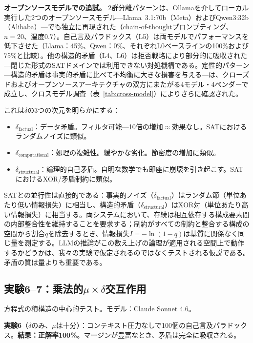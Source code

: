 \documentclass[11pt,a4paper]{article}
\begin{document}
\textbf{オープンソースモデルでの追試。}
2群分離パターンは、Ollamaを介してローカル実行した2つのオープンソースモデル---Llama~3.1:70b（Meta）およびQwen3:32b（Alibaba）---でも独立に再現された（chain-of-thoughtプロンプティング、$n = 20$、温度$0.7$）。自己言及パラドックス（L5）は両モデルでパフォーマンスを低下させた（Llama：45\%、Qwen：0\%、それぞれL0ベースラインの100\%および75\%と比較）。他の構造的矛盾（L4、L6）は拒否戦略により部分的に吸収された---閉じた形式のSATドメインでは利用できない対処機構である。定性的パターン---構造的矛盾は事実的矛盾に比べて不均衡に大きな損害を与える---は、クローズドおよびオープンソースアーキテクチャの双方にまたがる4モデル・4ベンダーで成立し、クロスモデル調査（表~\ref{tab:cross-model}）によりさらに確認された。

これは$\delta$の3つの次元を明らかにする：
\begin{itemize}
    \item $\delta_{\text{factual}}$：データ矛盾。フィルタ可能---10倍の増加$\approx$効果なし。SATにおけるランダムノイズに類似。
    \item $\delta_{\text{computational}}$：処理の複雑性。緩やかな劣化。節密度の増加に類似。
    \item $\delta_{\text{structural}}$：論理的自己矛盾。自明な数学でも即座に崩壊を引き起こす。SATにおけるXOR/矛盾制約に類似。
\end{itemize}

SATとの並行性は直接的である：事実的ノイズ（$\delta_{\text{factual}}$）はランダム節（単位あたり低い情報損失）に相当し、構造的矛盾（$\delta_{\text{structural}}$）はXOR対（単位あたり高い情報損失）に相当する。両システムにおいて、存続は相互依存する構成要素間の内部整合性を維持することを要求する；制約がすべての制約と整合する構成の空間から割合$q$を除去するとき、情報損失$I = -\ln(1-q)$は基質に関係なく同じ量を測定する。LLMの推論がこの数え上げの論理が適用される空間上で動作するかどうかは、我々の実験で仮定されるのではなくテストされる仮説である。矛盾の質は量よりも重要である。

\subsection{実験6--7：乗法的\texorpdfstring{$\mu \times \delta$}{μ×δ}交互作用}

方程式の積構造の中心的テスト。モデル：Claude Sonnet 4.6。

\textbf{実験6}（$\delta$のみ、$\mu$は十分）：コンテキスト圧力なしで100個の自己言及パラドックス。\textbf{結果：正解率100\%}。マージンが豊富なとき、矛盾は完全に吸収される。
\end{document}
